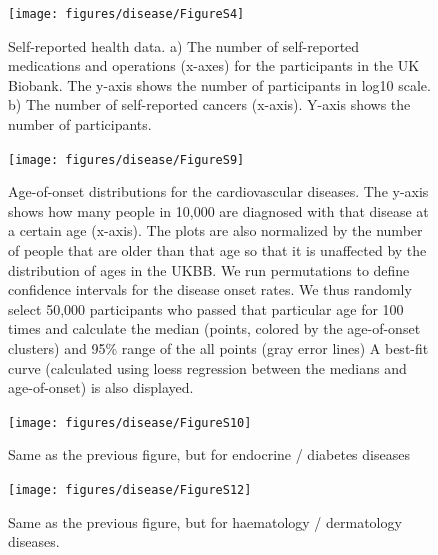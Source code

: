 \documentclass[12pt,twoside]{unicam}
\begin{document}
\begin{figure}

{\centering \texttt{[image: figures/disease/FigureS4]} 

}

\caption[Self-reported medications, operations, and cancers.]{Self-reported health data. a) The number of self-reported medications and operations (x-axes) for the participants in the UK Biobank. The y-axis shows the number of participants in log10 scale. b) The number of self-reported cancers (x-axis). Y-axis shows the number of participants.}\label{fig:disFigS4}
\end{figure}

\begin{figure}

{\centering \texttt{[image: figures/disease/FigureS9]} 

}

\caption[Age-of-onset distributions for the cardiovascular diseases.]{Age-of-onset distributions for the cardiovascular diseases. The y-axis shows how many people in 10,000 are diagnosed with that disease at a certain age (x-axis). The plots are also normalized by the number of people that are older than that age so that it is unaffected by the distribution of ages in the UKBB. We run permutations to define confidence intervals for the disease onset rates. We thus randomly select 50,000 participants who passed that particular age for 100 times and calculate the median (points, colored by the age-of-onset clusters) and 95\% range of the all points (gray error lines) A best-fit curve (calculated using loess regression between the medians and age-of-onset) is also displayed.}\label{fig:disFigS9}
\end{figure}

\begin{figure}

{\centering \texttt{[image: figures/disease/FigureS10]} 

}

\caption[Age-of-onset distributions for the endocrine / diabetes diseases.]{Same as the previous figure, but for endocrine / diabetes diseases}\label{fig:disFigS10}
\end{figure}

\begin{figure}

{\centering \texttt{[image: figures/disease/FigureS12]} 

}

\caption[Age-of-onset distributions for the haematology / dermatology diseases.]{Same as the previous figure, but for haematology / dermatology diseases.}\label{fig:disFigS12}
\end{figure}
\end{document}
